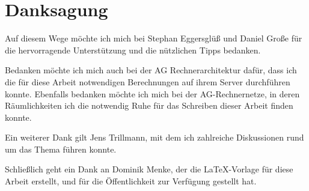 \section*{Danksagung}

Auf diesem Wege möchte ich mich bei Stephan Eggersglüß und Daniel Große für die hervorragende Unterstützung und die nützlichen Tipps bedanken.

Bedanken möchte ich mich auch bei der AG Rechnerarchitektur dafür, dass ich die für diese Arbeit notwendigen Berechnungen auf ihrem Server durchführen konnte.
Ebenfalls bedanken möchte ich mich bei der AG-Rechnernetze, in deren Räumlichkeiten ich die notwendig Ruhe für das Schreiben dieser Arbeit finden konnte.

Ein weiterer Dank gilt Jens Trillmann, mit dem ich zahlreiche Diskussionen rund um das Thema führen konnte.

Schließlich geht ein Dank an Dominik Menke, der die LaTeX-Vorlage für diese Arbeit erstellt, und für die Öffentlichkeit zur Verfügung gestellt hat.